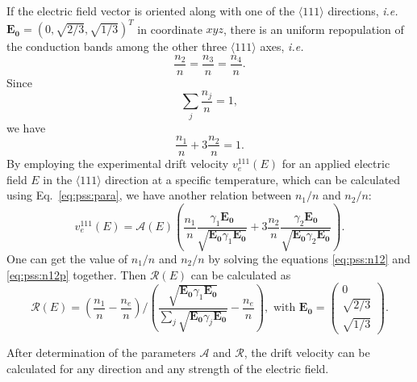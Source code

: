 If the electric field vector is oriented along with one of the $\langle111\rangle$ directions, \textit{i.e.} $\mathbf{E_{0}} = (0,\sqrt{2/3},\sqrt{1/3})^{T}$ in coordinate $xyz$, there is an uniform repopulation of the conduction bands among the other three $\langle111\rangle$ axes, \textit{i.e.}
\begin{equation}
  \label{eq:pss:n111}
  \frac{n_{2}}{n} = \frac{n_{3}}{n} = \frac{n_{4}}{n}.
\end{equation}
Since
\begin{equation}
  \label{eq:pss:nsum}
  \displaystyle \sum_{j}\frac{n_{j}}{n} = 1,
\end{equation}
we have
\begin{equation}
  \label{eq:pss:n12}
  \frac{n_{1}}{n} + 3\frac{n_{2}}{n}= 1.
\end{equation}
By employing the experimental drift velocity $v_{e}^{111}(E)$ for an applied electric field $E$ in the $\langle111\rangle$ direction at a specific temperature, which can be calculated using Eq.~\ref{eq:pss:para}, we have another relation between $n_{1}/n$ and $n_{2}/n$:
\begin{equation}
  \label{eq:pss:n12p}
  v_{e}^{111}(E) =  \mathcal{A}(E) \left(  \frac{n_{1}}{n} \frac{\gamma_{1}\mathbf{E_{0}}}         {\sqrt{\mathbf{E_{0}}\gamma_{1}\mathbf{E_{0}}}} +  3\frac{n_{2}}{n} \frac{\gamma_{2}\mathbf{E_{0}}}         {\sqrt{\mathbf{E_{0}}\gamma_{2}\mathbf{E_{0}}}} \right).
\end{equation}
One can get the value of $n_{1}/n$ and $n_{2}/n$ by solving the equations \ref{eq:pss:n12} and \ref{eq:pss:n12p} together. Then $\mathcal{R}(E)$ can be calculated as
\begin{equation}
  \label{eq:pss:re}
  \mathcal{R}(E) = \left( \frac{n_{1}}{n} - \frac{n_{e}}{n} \right) / \left( \frac{\sqrt{\mathbf{E_{0}}\gamma_{1}\mathbf{E_{0}}}}
    {\sum_{j}\sqrt{\mathbf{E_{0}}\gamma_{j}\mathbf{E_{0}}}} -                           \frac{n_{e}}{n} \right), \mbox{ with } \mathbf{E_{0}} = \left( \begin{array}{c} 
  0\\ \sqrt{2/3}\\\sqrt{1/3} \end{array} \right).
\end{equation}

After determination of the parameters $\mathcal{A}$ and $\mathcal{R}$, the drift velocity can be calculated for any direction and any strength of the electric field.

